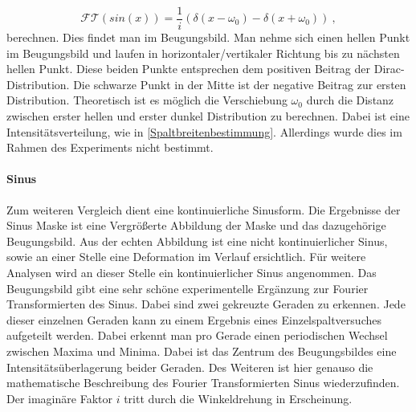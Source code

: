 \begin{equation}
	\mathcal{FT}(sin(x))=\frac{1}{i}(\delta(x-\omega_0)-\delta(x+\omega_0))~\mathrm{,}
\end{equation}
berechnen. Dies findet man im Beugungsbild. Man nehme sich einen hellen Punkt im Beugungsbild und laufen in horizontaler/vertikaler Richtung bis zu nächsten hellen Punkt. Diese beiden Punkte entsprechen dem positiven Beitrag der Dirac-Distribution. Die schwarze Punkt in der Mitte ist der negative Beitrag zur ersten Distribution. Theoretisch ist es möglich die Verschiebung $\omega_0$ durch die Distanz zwischen erster hellen und erster dunkel Distribution zu berechnen. Dabei ist eine Intensitätsverteilung, wie in \ref{Spaltbreitenbestimmung}. Allerdings wurde dies im Rahmen des Experiments nicht bestimmt.

\paragraph{Sinus} Zum weiteren Vergleich dient eine kontinuierliche Sinusform. Die Ergebnisse der Sinus Maske ist eine Vergrößerte Abbildung der Maske und das dazugehörige Beugungsbild. Aus der echten Abbildung ist eine nicht kontinuierlicher Sinus, sowie an einer Stelle eine Deformation im Verlauf ersichtlich. Für weitere Analysen wird an dieser Stelle ein kontinuierlicher Sinus angenommen. Das Beugungsbild gibt eine sehr schöne experimentelle Ergänzung zur Fourier Transformierten des Sinus. Dabei sind zwei gekreuzte Geraden zu erkennen. Jede dieser einzelnen Geraden kann zu einem Ergebnis eines Einzelspaltversuches aufgeteilt werden. Dabei erkennt man pro Gerade einen periodischen Wechsel zwischen Maxima und Minima. Dabei ist das Zentrum des Beugungsbildes eine Intensitätsüberlagerung beider Geraden. Des Weiteren ist hier genauso die mathematische Beschreibung des Fourier Transformierten Sinus wiederzufinden. Der imaginäre Faktor $i$ tritt durch die Winkeldrehung in Erscheinung.

